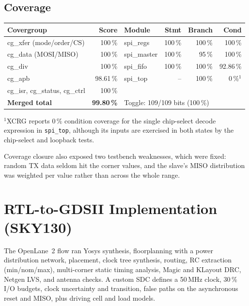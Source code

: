 \documentclass[11pt,a4paper]{article}
\newcommand{\sect}[1]{\section{\textcolor{accent}{#1}}}
\begin{document}
\subsection*{Coverage}
\begin{center}
\small
\begin{tabular}{lr@{\hspace{1.2cm}}lrrr}
\toprule
\textbf{Covergroup} & \textbf{Score} & \textbf{Module} & \textbf{Stmt} & \textbf{Branch} & \textbf{Cond}\\
\midrule
cg\_xfer (mode/order/CS) & 100\,\% & spi\_regs & 100\,\% & 100\,\% & 100\,\% \\
cg\_data (MOSI/MISO) & 100\,\% & spi\_master & 100\,\% & 95\,\% & 100\,\% \\
cg\_div & 100\,\% & spi\_fifo & 100\,\% & 100\,\% & 92.86\,\% \\
cg\_apb & 98.61\,\% & spi\_top & -- & 100\,\% & 0\,\%$^1$ \\
cg\_isr, cg\_status, cg\_ctrl & 100\,\% & & & & \\
\midrule
\textbf{Merged total} & \textbf{99.80\,\%} & \multicolumn{4}{l}{Toggle: 109/109 bits (100\,\%)} \\
\bottomrule
\end{tabular}
\end{center}
$^1$XCRG reports 0\,\% condition coverage for the single chip-select decode expression in \texttt{spi\_top}, although its inputs are exercised in both states by the chip-select and loopback tests.

Coverage closure also exposed two testbench weaknesses, which were fixed: random TX data seldom hit the corner values, and the slave's MISO distribution was weighted per value rather than across the whole range.

\sect{RTL-to-GDSII Implementation (SKY130)}
The OpenLane~2 flow ran Yosys synthesis, floorplanning with a power distribution network, placement, clock tree synthesis, routing, RC extraction (min/nom/max), multi-corner static timing analysis, Magic and KLayout DRC, Netgen LVS, and antenna checks. A custom SDC defines a 50\,MHz clock, 30\,\% I/O budgets, clock uncertainty and transition, false paths on the asynchronous reset and MISO, plus driving cell and load models.
\end{document}
